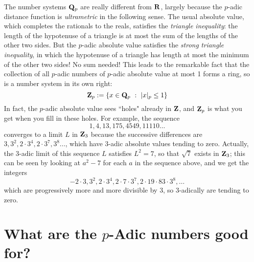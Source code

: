 \documentclass[11pt,oneside]{amsart}
\begin{document}
The number systems $\mathbf{Q}_p$ are really different from $\mathbf{R}$, largely because the $p$-adic distance function is {\em ultrametric}
in the following sense.
The usual absolute value, which completes the rationals to the reals, satisfies the {\em triangle inequality}: 
the length of the hypotenuse of a triangle is at most the sum of the lengths of the other two sides.  But the $p$-adic
absolute value satisfies the {\em strong triangle inequality}, in which the hypotenuse of a triangle has length at most the
minimum of the other two sides!  No sum needed!  This leads to the remarkable fact that the collection of all
$p$-adic numbers of $p$-adic absolute value at most 1 forms a ring, so is a number system in its own right:
$$
	\mathbf{Z}_p:=\{x\in \mathbf{Q}_p \ :\ |x|_p \le 1\}
$$
In fact, the $p$-adic absolute value sees ``holes" already in $\mathbf{Z}$, and $\mathbf{Z}_p$ is what you get when you fill in these holes.
For example, the sequence
$$
	1, 4, 13, 175, 4549, 11110\ldots
$$
converges to a limit $L$ in $\mathbf{Z}_3$ because the successive differences are $3,3^2,2\cdot 3^4, 2\cdot 3^7, 3^8\ldots$,
which have $3$-adic absolute values tending to zero.  Actually, the $3$-adic limit of this sequence $L$ satisfies $L^2 = 7$,
so that $\sqrt{7}$ exists in $\mathbf{Z}_3$; this can be seen by looking at $a^2 - 7$ for each $a$ in the sequence above, and we get the
integers
$$
	-2\cdot 3, 3^2, 2\cdot 3^4, 2\cdot 7\cdot 3^7,2\cdot19\cdot 83\cdot 3^8,\ldots
$$
which are progressively more and more divisible by $3$, so $3$-adically are tending to zero.


\section{What are the $p$-Adic numbers good for?}
\end{document}
